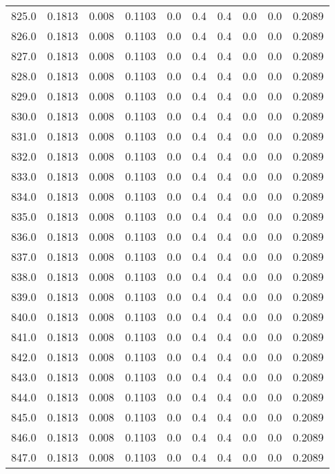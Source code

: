 \begin{longtable}{lrrrrrrrrr}
825.0 & 0.1813 & 0.008 & 0.1103 & 0.0 & 0.4 & 0.4 & 0.0 & 0.0 & 0.2089 \\
826.0 & 0.1813 & 0.008 & 0.1103 & 0.0 & 0.4 & 0.4 & 0.0 & 0.0 & 0.2089 \\
827.0 & 0.1813 & 0.008 & 0.1103 & 0.0 & 0.4 & 0.4 & 0.0 & 0.0 & 0.2089 \\
828.0 & 0.1813 & 0.008 & 0.1103 & 0.0 & 0.4 & 0.4 & 0.0 & 0.0 & 0.2089 \\
829.0 & 0.1813 & 0.008 & 0.1103 & 0.0 & 0.4 & 0.4 & 0.0 & 0.0 & 0.2089 \\
830.0 & 0.1813 & 0.008 & 0.1103 & 0.0 & 0.4 & 0.4 & 0.0 & 0.0 & 0.2089 \\
831.0 & 0.1813 & 0.008 & 0.1103 & 0.0 & 0.4 & 0.4 & 0.0 & 0.0 & 0.2089 \\
832.0 & 0.1813 & 0.008 & 0.1103 & 0.0 & 0.4 & 0.4 & 0.0 & 0.0 & 0.2089 \\
833.0 & 0.1813 & 0.008 & 0.1103 & 0.0 & 0.4 & 0.4 & 0.0 & 0.0 & 0.2089 \\
834.0 & 0.1813 & 0.008 & 0.1103 & 0.0 & 0.4 & 0.4 & 0.0 & 0.0 & 0.2089 \\
835.0 & 0.1813 & 0.008 & 0.1103 & 0.0 & 0.4 & 0.4 & 0.0 & 0.0 & 0.2089 \\
836.0 & 0.1813 & 0.008 & 0.1103 & 0.0 & 0.4 & 0.4 & 0.0 & 0.0 & 0.2089 \\
837.0 & 0.1813 & 0.008 & 0.1103 & 0.0 & 0.4 & 0.4 & 0.0 & 0.0 & 0.2089 \\
838.0 & 0.1813 & 0.008 & 0.1103 & 0.0 & 0.4 & 0.4 & 0.0 & 0.0 & 0.2089 \\
839.0 & 0.1813 & 0.008 & 0.1103 & 0.0 & 0.4 & 0.4 & 0.0 & 0.0 & 0.2089 \\
840.0 & 0.1813 & 0.008 & 0.1103 & 0.0 & 0.4 & 0.4 & 0.0 & 0.0 & 0.2089 \\
841.0 & 0.1813 & 0.008 & 0.1103 & 0.0 & 0.4 & 0.4 & 0.0 & 0.0 & 0.2089 \\
842.0 & 0.1813 & 0.008 & 0.1103 & 0.0 & 0.4 & 0.4 & 0.0 & 0.0 & 0.2089 \\
843.0 & 0.1813 & 0.008 & 0.1103 & 0.0 & 0.4 & 0.4 & 0.0 & 0.0 & 0.2089 \\
844.0 & 0.1813 & 0.008 & 0.1103 & 0.0 & 0.4 & 0.4 & 0.0 & 0.0 & 0.2089 \\
845.0 & 0.1813 & 0.008 & 0.1103 & 0.0 & 0.4 & 0.4 & 0.0 & 0.0 & 0.2089 \\
846.0 & 0.1813 & 0.008 & 0.1103 & 0.0 & 0.4 & 0.4 & 0.0 & 0.0 & 0.2089 \\
847.0 & 0.1813 & 0.008 & 0.1103 & 0.0 & 0.4 & 0.4 & 0.0 & 0.0 & 0.2089 \\

\end{longtable}
